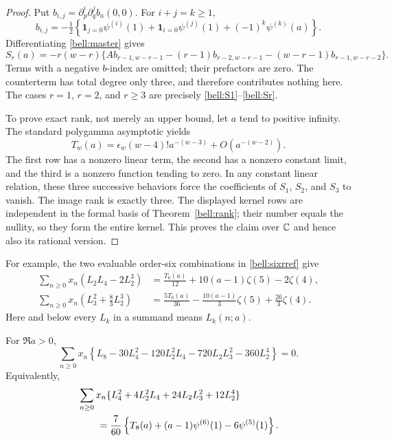 \begin{proof}
Put $b_{i,j}=\partial_p^i\partial_q^jb_a(0,0)$. For $i+j=k\ge1$,
\[
 b_{i,j}=-\tfrac12\left\{
 \mathbf1_{j=0}\psi^{(i)}(1)+\mathbf1_{i=0}\psi^{(j)}(1)
                     +(-1)^k\psi^{(k)}(a)\right\}.
\]
Differentiating \eqref{bell:master} gives
\[
 S_r(a)=-r(w-r)\{A b_{r-1,w-r-1}
 -(r-1)b_{r-2,w-r-1}-(w-r-1)b_{r-1,w-r-2}\}.
\]
Terms with a negative $b$-index are omitted; their prefactors are zero.
The counterterm has total degree only three, and therefore contributes
nothing here. The cases $r=1$, $r=2$, and $r\ge3$ are precisely
\eqref{bell:S1}--\eqref{bell:Sr}.

To prove exact rank, not merely an upper bound, let $a$ tend to positive
infinity. The standard polygamma asymptotic yields
\[
 T_w(a)=\epsilon_w(w-4)!a^{-(w-3)}+O(a^{-(w-2)}).
\]
The first row has a nonzero linear term, the second has a nonzero
constant limit, and the third is a nonzero function tending to zero.
In any constant linear relation, these three successive behaviors force
the coefficients of $S_1$, $S_2$, and $S_3$ to vanish. The image rank is
exactly three. The displayed kernel rows are independent in the formal
basis of Theorem~\ref{bell:rank}; their number equals the nullity, so
they form the entire kernel. This proves the claim over $\mathbb C$ and hence
also its rational version.
\end{proof}

For example, the two evaluable order-six combinations in
\eqref{bell:sixrref} give
\begin{align}
 \sum_{n\ge0}x_n(L_2L_4-2L_2^3)
 &=\frac{T_6(a)}{12}+10(a-1)\zeta(5)-2\zeta(4),\label{bell:sixidentity1}\\
 \sum_{n\ge0}x_n\left(L_3^2+\frac83L_2^3\right)
 &=\frac{5T_6(a)}{36}-\frac{10(a-1)}3\zeta(5)
                                    +\frac{26}3\zeta(4).
 \label{bell:sixidentity2}
\end{align}
Here and below every $L_k$ in a summand means $L_k(n;a)$.

\begin{corollary}
\label{bell:quartic}
For $\Re a>0$,
\begin{equation}
 \sum_{n\ge0}x_n\left\{
 L_8-30L_4^2-120L_2^2L_4-720L_2L_3^2-360L_2^4\right\}=0.
 \label{bell:quarticzero}
\end{equation}
Equivalently,
\begin{align}
 &\sum_{n\ge0}x_n\{L_4^2+4L_2^2L_4+24L_2L_3^2+12L_2^4\}\notag\\
 &\qquad=\frac7{60}\left\{T_8(a)+(a-1)\psi^{(6)}(1)
                                         -6\psi^{(5)}(1)\right\}.
 \label{bell:quarticvalue}
\end{align}
\end{corollary}

